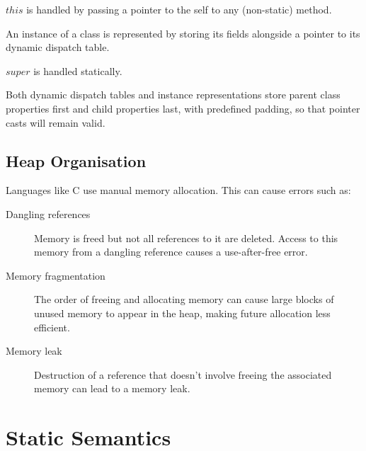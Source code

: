 \documentclass[landscape]{cheat}
\begin{document}
\begin{multicols}{3}
$this$ is handled by passing a pointer to the self to any (non-static) method.

An instance of a class is represented by storing its fields alongside a pointer to its dynamic dispatch table.

$super$ is handled statically.

Both dynamic dispatch tables and instance representations store parent class properties first and child properties last, with predefined padding, so that pointer casts will remain valid.

\subsection{Heap Organisation}
Languages like C use manual memory allocation. This can cause errors such as:
\begin{description}
\item[Dangling references] Memory is freed but not all references to it are deleted. Access to this memory from a dangling reference causes a use-after-free error.
\item[Memory fragmentation] The order of freeing and allocating memory can cause large blocks of unused memory to appear in the heap, making future allocation less efficient.
\item[Memory leak] Destruction of a reference that doesn't involve freeing the associated memory can lead to a memory leak.
\end{description}

\section{Static Semantics}

\end{multicols}
\end{document}
